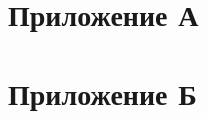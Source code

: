 \documentclass[12pt,a4paper]{book}
\begin{document}
\chapter{Приложение А}

\chapter{Приложение Б}

\end{document}
